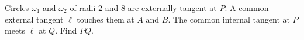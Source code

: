 Circles $\omega_1$ and $\omega_2$ of radii $2$ and $8$ are externally tangent at $P$. A common external tangent $\ell$ touches them at $A$ and $B$. The common internal tangent at $P$ meets $\ell$ at $Q$. Find $PQ$.
